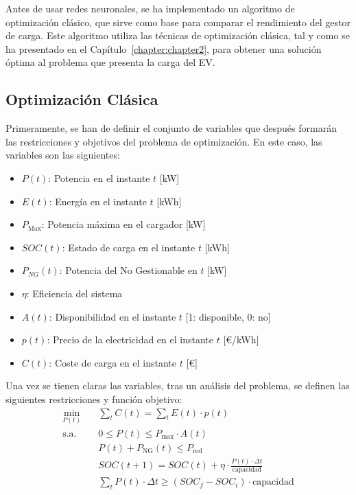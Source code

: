 Antes de usar redes neuronales, se ha implementado un algoritmo de optimización clásico, que
sirve como base para comparar el rendimiento del gestor de carga. Este algoritmo utiliza las 
técnicas de optimización clásica, tal y como se ha presentado en el Capítulo~\ref{chapter:chapter2}, 
para obtener una solución óptima al problema que presenta la carga del EV.\\

\subsection{Optimización Clásica}
Primeramente, se han de definir el conjunto de variables que después formarán las restricciones y
objetivos del problema de optimización. En este caso, las variables son las siguientes:
\begin{itemize}
    \item $\mathit{P}(t)$: Potencia en el instante $t$ [kW]
    \item $\mathit{E}(t)$: Energía en el instante $t$ [kWh]
    \item $P_\text{Max}$: Potencia máxima en el cargador [kW]
    \item $\mathit{SOC}(t)$: Estado de carga en el instante $t$ [kWh]
    \item $P_{NG}(t)$: Potencia del No Gestionable en $t$ [kW]
    \item $\eta$: Eficiencia del sistema
    \item $A(t)$: Disponibilidad en el instante $t$ [1: disponible, 0: no]
    \item $p(t)$: Precio de la electricidad en el instante $t$ [€/kWh]
    \item $C(t)$: Coste de carga en el instante $t$ [€]
\end{itemize}

Una vez se tienen claras las variables, tras un análisis del problema, se definen las siguientes
restricciones y función objetivo:
\begin{align}
    \min_{P(t)} \quad & \sum_{t} C(t) = \sum_{t} E(t) \cdot p(t) \label{eq:objective_cost} \\[6pt]
    \text{s.a.} \quad & 0 \leq P(t) \leq P_{\text{max}} \cdot A(t) \label{eq:charging_window} \\[6pt]
    & P(t) + P_{\text{NG}}(t) \leq P_{\text{red}} \label{eq:grid_limit} \\[6pt]
    & SOC(t+1) = SOC(t) + \eta \cdot \frac{P(t) \cdot \Delta t}{\text{capacidad}} \label{eq:soc_update} \\[6pt]
    & \sum_{t} P(t) \cdot \Delta t \geq (SOC_f - SOC_i) \cdot \text{capacidad} \label{eq:soc_requirement}
\end{align}
 
